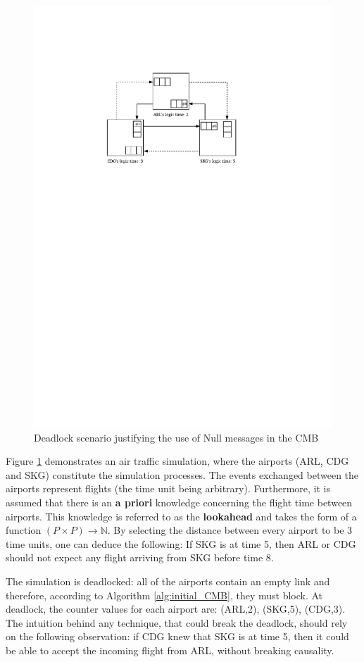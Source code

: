 \documentclass[11pt]{article}
\begin{document}
\begin{figure}[htbp]
\centering
\includegraphics[width=0.64\linewidth]{Figures/deadlockScenario.pdf}
\caption{\label{fig:org9269447}
Deadlock scenario justifying the use of Null messages in the CMB}
\end{figure}

Figure \ref{fig:org9269447} demonstrates an air traffic simulation, where the airports (ARL, CDG and SKG) constitute the simulation processes.
The events exchanged between the airports represent flights (the time unit being arbitrary).
Furthermore, it is assumed that there is an \textbf{a priori} knowledge concerning the flight time between airports.
This knowledge is referred to as the \textbf{lookahead} and takes the form of a function \((P \times P) \rightarrow \mathbb{N}\).
By selecting the distance between every airport to be 3 time units, one can deduce the following:
If SKG is at time 5, then ARL or CDG should not expect any flight arriving from SKG before time 8.

The simulation is deadlocked: all of the airports contain an empty link and therefore, according to Algorithm \ref{alg:initial_CMB}, they must block.
At deadlock, the counter values for each airport are: (ARL,2), (SKG,5), (CDG,3).
The intuition behind any technique, that could break the deadlock, should rely on the following observation:
if CDG knew that SKG is at time 5, then it could be able to accept the incoming flight from ARL, without breaking causality.
\end{document}
